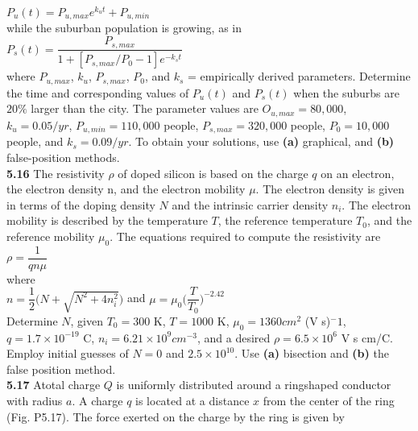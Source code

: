 \documentclass[../main.tex]{subfiles}
\begin{document}
\begin{multicols}{2}
    $P_u(t)=P_{u,max}e^{k_ut}+P_{u,min}$\\

    \noindent while the suburban population is growing, as in\\

    $P_s(t) = \dfrac{P_{s,max}}{1+[P_{s,max}/P_0-1]e^{-k_st}}$\\

    \noindent where $P_{u,max}$, $k_u$, $P_{s,max}$, $P_0$, and $k_s$ =
    empirically derived parameters. Determine the time and corresponding values
    of $P_u(t)$ and $P_s(t)$ when the suburbs are $20\%$ larger than the city.
    The parameter values are $O_{u,max}=80,000$, $k_u=0.05/yr$, $P_{u,min}=110,000$ 
    people, $P_{s,max}=320,000$ people, $P_0=10,000$ people, and $k_s=0.09/yr$.
    To obtain your solutions, use \textbf{(a)} graphical, and \textbf{(b)} 
    false-position methods.\\

    \noindent\textbf{5.16} The resistivity $\rho$ of doped silicon is based on the
    charge $q$ on an electron, the electron density n, and the electron
    mobility $\mu$. The electron density is given in terms of
    the doping density $N$ and the intrinsic carrier density $n_i$. The
    electron mobility is described by the temperature $T$, the reference
    temperature $T_0$, and the reference mobility $μ_0$. The
    equations required to compute the resistivity are\\

    $\rho = \dfrac{1}{qn\mu}$\\

    \noindent where\\

    \noindent $n = \dfrac{1}{2}\Big(N+\sqrt{N^2+4n^2_i}\Big)$\hspace{3mm} and\hspace{3mm}
    $\mu= \mu_0 \Big(\dfrac{T}{T_0} \Big)^{-2.42}$\\

    \noindent Determine $N$, given $T_0=300$ K, $T = 1000$ K, $\mu_0=1360cm^2$ (V s)$^-1$,
    $q=1.7\times10^{-19}$ C, $n_i= 6.21\times 10^9 cm^{-3}$, and a desired $\rho = 6.5\times 10^6$ 
    V s cm/C. Employ initial guesses of $N = 0$ and $2.5\times 10^{10}$. Use \textbf{(a)} bisection
    and \textbf{(b)} the false position method.\\

    \noindent\textbf{5.17} Atotal charge $Q$ is uniformly distributed around a ringshaped
    conductor with radius $a$. A charge $q$ is located at a
    distance $x$ from the center of the ring (Fig. P5.17). The force
    exerted on the charge by the ring is given by\\


\end{multicols}
\end{document}
